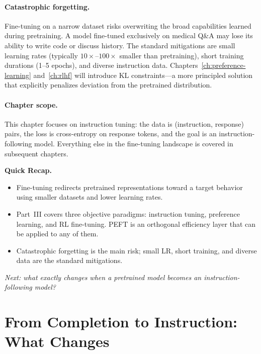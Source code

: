 \paragraph{Catastrophic forgetting.} Fine-tuning on a narrow dataset risks overwriting the broad capabilities learned during pretraining. A model fine-tuned exclusively on medical Q\&A may lose its ability to write code or discuss history. The standard mitigations are small learning rates (typically $10\times$--$100\times$ smaller than pretraining), short training durations (1--5 epochs), and diverse instruction data. Chapters~\ref{ch:preference-learning} and~\ref{ch:rlhf} will introduce KL constraints---a more principled solution that explicitly penalizes deviation from the pretrained distribution.

\paragraph{Chapter scope.} This chapter focuses on instruction tuning: the data is (instruction, response) pairs, the loss is cross-entropy on response tokens, and the goal is an instruction-following model. Everything else in the fine-tuning landscape is covered in subsequent chapters.

\begin{quickrecap}
\textbf{Quick Recap.}
\begin{itemize}[nosep,leftmargin=1.5em]
  \item Fine-tuning redirects pretrained representations toward a target behavior using smaller datasets and lower learning rates.
  \item Part~III covers three objective paradigms: instruction tuning, preference learning, and RL fine-tuning. PEFT is an orthogonal efficiency layer that can be applied to any of them.
  \item Catastrophic forgetting is the main risk; small LR, short training, and diverse data are the standard mitigations.
\end{itemize}
\textit{Next: what exactly changes when a pretrained model becomes an instruction-following model?}
\end{quickrecap}


\section{From Completion to Instruction: What Changes}
\label{sec:completion-to-instruction}

